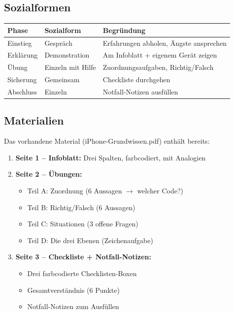 \documentclass[11pt,a4paper]{article}
\begin{document}
\subsection{Sozialformen}

\begin{tabular}{|l|l|l|}
\hline
\textbf{Phase} & \textbf{Sozialform} & \textbf{Begründung} \\
\hline
Einstieg & Gespräch & Erfahrungen abholen, Ängste ansprechen \\
\hline
Erklärung & Demonstration & Am Infoblatt + eigenem Gerät zeigen \\
\hline
Übung & Einzeln mit Hilfe & Zuordnungsaufgaben, Richtig/Falsch \\
\hline
Sicherung & Gemeinsam & Checkliste durchgehen \\
\hline
Abschluss & Einzeln & Notfall-Notizen ausfüllen \\
\hline
\end{tabular}

\subsection{Materialien}

Das vorhandene Material (iPhone-Grundwissen.pdf) enthält bereits:
\begin{enumerate}
    \item \textbf{Seite 1 -- Infoblatt:} Drei Spalten, farbcodiert, mit Analogien
    \item \textbf{Seite 2 -- Übungen:}
    \begin{itemize}
        \item Teil A: Zuordnung (6 Aussagen $\rightarrow$ welcher Code?)
        \item Teil B: Richtig/Falsch (6 Aussagen)
        \item Teil C: Situationen (3 offene Fragen)
        \item Teil D: Die drei Ebenen (Zeichenaufgabe)
    \end{itemize}
    \item \textbf{Seite 3 -- Checkliste + Notfall-Notizen:}
    \begin{itemize}
        \item Drei farbcodierte Checklisten-Boxen
        \item Gesamtverständnis (6 Punkte)
        \item Notfall-Notizen zum Ausfüllen
    \end{itemize}
\end{enumerate}
\end{document}
